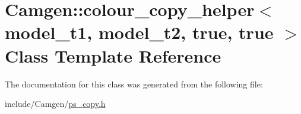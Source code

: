 \hypertarget{a00072}{}\section{Camgen\+:\+:colour\+\_\+copy\+\_\+helper$<$ model\+\_\+t1, model\+\_\+t2, true, true $>$ Class Template Reference}
\label{a00072}


The documentation for this class was generated from the following file\+:\begin{DoxyCompactItemize}
\item 
include/\+Camgen/\hyperlink{a00740}{ps\+\_\+copy.\+h}\end{DoxyCompactItemize}
